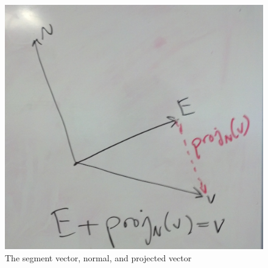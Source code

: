 \documentclass[conference]{acmsiggraph}
\begin{document}
\begin{figure}[ht]
\centering
\includegraphics[width=\columnwidth]{vectordiagram.jpg}
\caption{The segment vector, normal, and projected vector}
\label{vectordiagram}
\end{figure}
\end{document}
